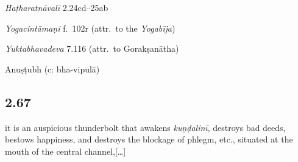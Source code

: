 \begin{ekdosis}
\begin{sources}[hp02_066]
\begin{versinnote}
\end{versinnote}
\end{sources}

\begin{testimonia}[hp02_066]
\emph{Haṭharatnāvalī} 2.24cd–25ab

\begin{versinnote}
\end{versinnote}

\emph{Yogacintāmaṇi} f.~102r (attr.~to the \emph{Yogabīja})

\begin{versinnote}
\end{versinnote}

\emph{Yuktabhavadeva} 7.116 (attr.~to Gorakṣanātha)
\begin{versinnote}
\end{versinnote}

\end{testimonia}


\begin{metre}[hp02_066]
Anuṣṭubh (c: bha-vipulā)
\end{metre}

\subsection*{2.67}
\begin{translation}[hp02_067]
it is an auspicious thunderbolt that awakens \emph{kuṇḍalinī}, destroys bad deeds, bestows happiness, and destroys the blockage of phlegm, etc., situated at the mouth of the central channel,[\dots]
\end{translation}


\end{ekdosis}
